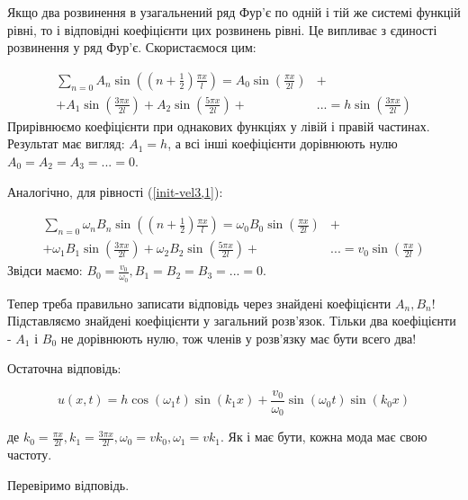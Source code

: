Якщо два розвинення в узагальнений ряд Фур'є по одній і тій же системі функцій рівні, то і відповідні коефіцієнти цих розвинень рівні. Це випливає з єдиності розвинення у ряд Фур'є. Скористаємося цим:

\begin{equation}
    \begin{aligned}
        \sum_{n=0} A_n \sin \left( (n + \frac{1}{2}) \frac{\pi x}{l} \right) = A_0 \sin \left(\frac{\pi x}{2 l} \right) &+\\
        + A_1 \sin \left(\frac{3 \pi x}{2 l} \right) + A_2 \sin \left(\frac{5 \pi x}{2 l} \right) + &... = h \sin \left( \frac{3 \pi x}{2 l} \right)
    \end{aligned}
\end{equation}
Прирівнюємо коефіцієнти при однакових функціях у лівій і правій частинах. Результат має вигляд: $A_1 = h$, а всі інші коефіцієнти дорівнюють нулю $A_0 = A_2 = A_3 = ... = 0$.

Аналогічно, для рівності (\ref{init-vel3,1}): 

\begin{equation}
    \begin{aligned}
        \sum_{n=0} \omega_n B_n \sin \left( (n + \frac{1}{2}) \frac{\pi x}{l} \right) = \omega_0 B_0 \sin \left(\frac{\pi x}{2 l} \right) &+\\
        + \omega_1 B_1 \sin \left(\frac{3 \pi x}{2 l} \right) + \omega_2 B_2 \sin \left(\frac{5 \pi x}{2 l} \right) + &... = v_0 \sin \left( \frac{\pi x}{2 l} \right)
    \end{aligned}
\end{equation}
Звідси маємо: $B_0 = \frac{v_0}{\omega_0}, B_1 = B_2 = B_3 = ... = 0$.

Тепер треба правильно записати відповідь через знайдені коефіцієнти $A_n, B_n$! Підставляємо знайдені коефіцієнти у загальний розв'язок. Тільки два коефіцієнти - $A_1$ і $B_0$ не дорівнюють нулю, тож членів у розв'язку має бути всего два!

Остаточна відповідь:

\begin{equation}
    u (x,t) = h \cos (\omega_1 t) \sin (k_1 x) + \frac{v_0}{\omega_0} \sin (\omega_0 t) \sin (k_0 x)
\end{equation}

де $k_0 = \frac{\pi x}{2 l}, k_1 = \frac{3 \pi x}{2 l}, \omega_0 = v k_0, \omega_1 = v k_1 $. Як і має бути, кожна мода має свою частоту.

Перевіримо відповідь.

